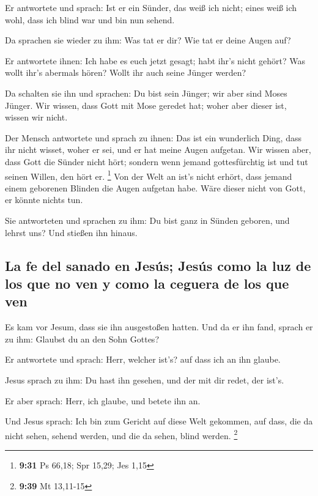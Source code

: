  Er antwortete und sprach: Ist er ein Sünder, das weiß
ich nicht; eines weiß ich wohl, dass ich blind war und bin nun sehend.

 Da sprachen sie wieder zu ihm: Was tat er dir? Wie tat
er deine Augen auf?

 Er antwortete ihnen: Ich habe es euch jetzt gesagt; habt
ihr's nicht gehört? Was wollt ihr's abermals hören? Wollt ihr auch seine
Jünger werden?

 Da schalten sie ihn und sprachen: Du bist sein Jünger;
wir aber sind Moses Jünger.  Wir wissen, dass Gott mit
Mose geredet hat; woher aber dieser ist, wissen wir nicht.

 Der Mensch antwortete und sprach zu ihnen: Das ist ein
wunderlich Ding, dass ihr nicht wisset, woher er sei, und er hat meine
Augen aufgetan.  Wir wissen aber, dass Gott die Sünder
nicht hört; sondern wenn jemand gottesfürchtig ist und tut seinen
Willen, den hört er. \footnote{\textbf{9:31} Ps 66,18; Spr 15,29; Jes
  1,15}  Von der Welt an ist's nicht erhört, dass jemand
einem geborenen Blinden die Augen aufgetan habe.  Wäre
dieser nicht von Gott, er könnte nichts tun.

 Sie antworteten und sprachen zu ihm: Du bist ganz in
Sünden geboren, und lehrst uns? Und stießen ihn hinaus.

\hypertarget{la-fe-del-sanado-en-jesuxfas-jesuxfas-como-la-luz-de-los-que-no-ven-y-como-la-ceguera-de-los-que-ven}{%
\subsection{La fe del sanado en Jesús; Jesús como la luz de los que no
ven y como la ceguera de los que
ven}\label{la-fe-del-sanado-en-jesuxfas-jesuxfas-como-la-luz-de-los-que-no-ven-y-como-la-ceguera-de-los-que-ven}}

 Es kam vor Jesum, dass sie ihn ausgestoßen hatten. Und
da er ihn fand, sprach er zu ihm: Glaubst du an den Sohn Gottes?

 Er antwortete und sprach: Herr, welcher ist's? auf dass
ich an ihn glaube.

 Jesus sprach zu ihm: Du hast ihn gesehen, und der mit
dir redet, der ist's.

 Er aber sprach: Herr, ich glaube, und betete ihn an.

 Und Jesus sprach: Ich bin zum Gericht auf diese Welt
gekommen, auf dass, die da nicht sehen, sehend werden, und die da sehen,
blind werden. \footnote{\textbf{9:39} Mt 13,11-15}

